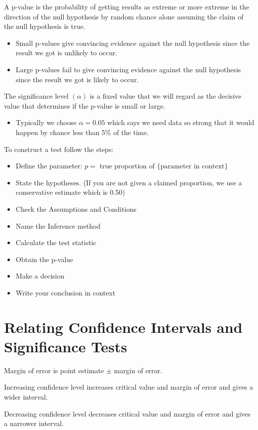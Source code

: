 \documentclass[../stats.tex]{subfiles}
\begin{document}
A p-value is the probability of getting results as extreme or more extreme in the direction of the null hypothesis by random chance alone assuming the claim of the null hypothesis is true.
\begin{itemize}
    \item Small p-values give convincing evidence against the null hypothesis since the result we got is unlikely to occur.
    \item Large p-values fail to give convincing evidence against the null hypothesis since the result we got is likely to occur.
\end{itemize}
The significance level $(\alpha)$ is a fixed value that we will regard as the decisive value that determines if the p-value is small or large.
\begin{itemize}
    \item Typically we choose $\alpha = 0.05$ which says we need data so strong that it would happen by chance less than 5\% of the time.
\end{itemize}

To construct a test follow the steps:
\begin{itemize}
    \item Define the parameter: $p=$ true proportion of $\{\text{parameter in context}\}$
    \item State the hypotheses. (If you are not given a claimed proportion, we use a conservative estimate which is 0.50)
    \item Check the Assumptions and Conditions 
    \item Name the Inference method 
    \item Calculate the test statistic
    \item Obtain the p-value 
    \item Make a decision 
    \item Write your conclusion in context 
\end{itemize}

\section{Relating Confidence Intervals and Significance Tests}
Margin of error is point estimate $\pm$ margin of error. 

Increasing confidence level increases critical value and margin of error and gives a wider interval.

Decreasing confidence level decreases critical value and margin of error and gives a narrower interval.
\end{document}
